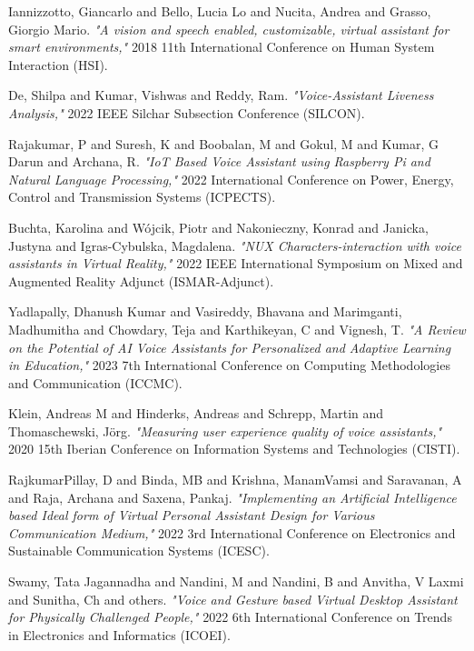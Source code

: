\documentclass[conference]{IEEEtran}
\begin{document}
\begin{thebibliography}{20}
Iannizzotto, Giancarlo and Bello, Lucia Lo and Nucita, Andrea and Grasso, Giorgio Mario. \emph{"A vision and speech enabled, customizable, virtual assistant for smart environments,"} 2018 11th International Conference on Human System Interaction (HSI).

De, Shilpa and Kumar, Vishwas and Reddy, Ram. \emph{"Voice-Assistant Liveness Analysis,"} 2022 IEEE Silchar Subsection Conference (SILCON).

Rajakumar, P and Suresh, K and Boobalan, M and Gokul, M and Kumar, G Darun and Archana, R. \emph{"IoT Based Voice Assistant using Raspberry Pi and Natural Language Processing,"} 2022 International Conference on Power, Energy, Control and Transmission Systems (ICPECTS).

Buchta, Karolina and W{\'o}jcik, Piotr and Nakonieczny, Konrad and Janicka, Justyna and Igras-Cybulska, Magdalena. \emph{"NUX Characters-interaction with voice assistants in Virtual Reality,"} 2022 IEEE International Symposium on Mixed and Augmented Reality Adjunct (ISMAR-Adjunct).

Yadlapally, Dhanush Kumar and Vasireddy, Bhavana and Marimganti, Madhumitha and Chowdary, Teja and Karthikeyan, C and Vignesh, T. \emph{"A Review on the Potential of AI Voice Assistants for Personalized and Adaptive Learning in Education,"} 2023 7th International Conference on Computing Methodologies and Communication (ICCMC).

Klein, Andreas M and Hinderks, Andreas and Schrepp, Martin and Thomaschewski, J{\"o}rg. \emph{"Measuring user experience quality of voice assistants,"} 2020 15th Iberian Conference on Information Systems and Technologies (CISTI).

RajkumarPillay, D and Binda, MB and Krishna, ManamVamsi and Saravanan, A and Raja, Archana and Saxena, Pankaj. \emph{"Implementing an Artificial Intelligence based Ideal form of Virtual Personal Assistant Design for Various Communication Medium,"} 2022 3rd International Conference on Electronics and Sustainable Communication Systems (ICESC).

Swamy, Tata Jagannadha and Nandini, M and Nandini, B and Anvitha, V Laxmi and Sunitha, Ch and others. \emph{"Voice and Gesture based Virtual Desktop Assistant for Physically Challenged People,"} 2022 6th International Conference on Trends in Electronics and Informatics (ICOEI).


\end{thebibliography}
\end{document}
